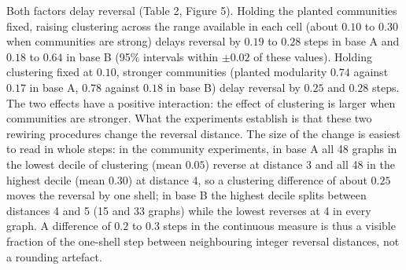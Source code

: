 \documentclass{nws}
\begin{document}
Both factors delay reversal (Table 2, Figure 5). Holding the planted communities
fixed, raising clustering across the range available in each cell (about $0.10$ to $0.30$
when communities are strong) delays reversal by $0.19$ to $0.28$ steps in base A and
$0.18$ to $0.64$ in base B (95\% intervals within $\pm0.02$ of these values). Holding clustering fixed at $0.10$, stronger communities (planted modularity
$0.74$ against $0.17$ in base A, $0.78$ against $0.18$ in base B) delay reversal
by $0.25$ and $0.28$ steps. The two effects have a positive interaction: the
effect of clustering is larger when communities are stronger. 
What the experiments establish is that these two rewiring procedures change the reversal
distance. The size of the change is easiest to read in whole steps: in the community experiments, in base A all 48
graphs in the lowest decile of clustering (mean $0.05$) reverse at distance 3 and all
48 in the highest decile (mean $0.30$) at distance 4, so a clustering difference of
about $0.25$ moves the reversal by one shell; in base B the highest decile splits between
distances 4 and 5 (15 and 33 graphs) while the lowest reverses at 4 in every graph.
A difference of $0.2$ to $0.3$ steps in the continuous measure is thus a visible fraction of the one-shell
step between neighbouring integer reversal distances, not a rounding artefact.
\end{document}
